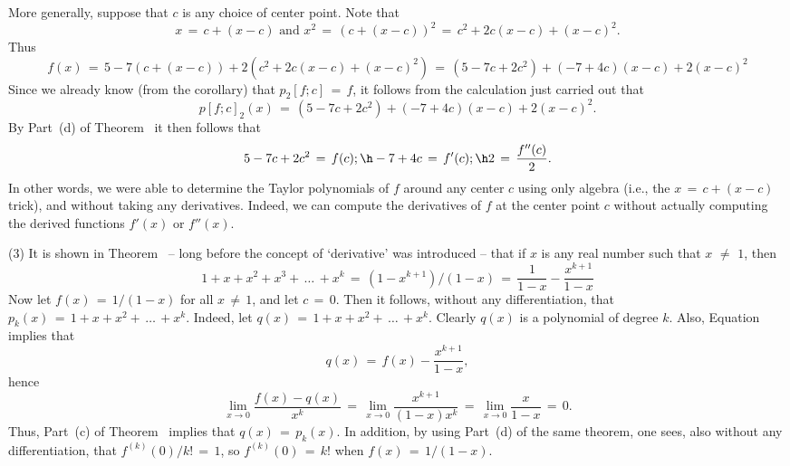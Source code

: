 {        More generally, suppose that $c$ is any choice of center point.
    Note that
        \begin{displaymath}
        x \,=\, c+(x-c) \mbox{ and } x^{2} \,=\, (c+(x-c))^{2} \,=\, c^{2} + 2c(x-c) + (x-c)^{2}.
        \end{displaymath}
    Thus
        \begin{displaymath}
        f(x) \,=\, 5-7(c+(x-c)) + 2(c^{2} + 2c(x-c) + (x-c)^{2}) \,=\, 
    (5-7c+2c^{2}) + (-7+4c)(x-c) + 2(x-c)^{2}
        \end{displaymath}
    Since we already know (from the corollary) that $p_{2}[f;c] \,=\, f$, it follows from the calculation just carried out that
        \begin{displaymath}
        p[f;c]_{2}(x) \,=\, (5-7c+2c^{2}) + (-7+4c)(x-c) + 2(x-c)^{2}.
        \end{displaymath}
    By Part~(d) of Theorem~ it then follows that
        \begin{displaymath}
        5-7c+2c^{2} \,=\, f(c); \h -7+4c \,=\, f'(c); \h
    2 \,=\, \frac{f''(c)}{2}.
        \end{displaymath}
    In other words, we were able to determine the Taylor polynomials of $f$ around any center $c$ using only algebra (i.e., the $x \,=\, c+(x-c)$ trick), 
    and without taking any derivatives. Indeed, we can compute the derivatives of $f$ at the
    center point $c$ without actually computing the derived functions $f'(x)$ or $f''(x)$.

\V
        

        (3) It is shown in Theorem~  -- long before the concept of `derivative' was introduced -- that if $x$ is any real number such that $x \,\,{\neq}\,\, 1$, then
        \begin{equation}
        \label{EqnE.130}
        1+x+x^{2}+x^{3}+ \,{\ldots}\, +x^{k} \,=\, (1-x^{k+1})/(1-x) \,=\, 
        \frac{1}{1-x} - \frac{x^{k+1}}{1-x}
        \end{equation}
    Now let $f(x) \,=\, 1/(1-x)$ for all $x\,{\neq}\,1$, and let $c \,=\, 0$.
    Then it follows, without any differentiation, that $p_{k}(x) \,=\, 1+x+x^{2}+ \,{\ldots}\, +x^{k}$.
    Indeed, let $q(x) \,=\, 1+x+x^{2}+ \,{\ldots}\, +x^{k}$.
    Clearly $q(x)$ is a polynomial of degree $k$.
    Also, Equation~ implies that
        \begin{displaymath}
        q(x) \,=\, f(x) - \frac{x^{k+1}}{1-x},
        \end{displaymath}
    hence
        \begin{displaymath}
        \lim_{x {\rightarrow} 0} \frac{f(x)-q(x)}{x^{k}} \,=\, \lim_{x {\rightarrow} 0} \frac{x^{k+1}}{(1-x)x^{k}} \,=\, \lim_{x {\rightarrow} 0} \frac{x}{1-x} \,=\, 0.
        \end{displaymath}
    Thus, Part~(c) of Theorem~ implies that $q(x) \,=\, p_{k}(x)$.
    In addition, by using Part~(d) of the same theorem, one sees, also without any differentiation, that $f^{(k)}(0)/k! \,=\, 1$, so $f^{(k)}(0) \,=\, k!$ when $f(x) \,=\, 1/(1-x)$.


}
